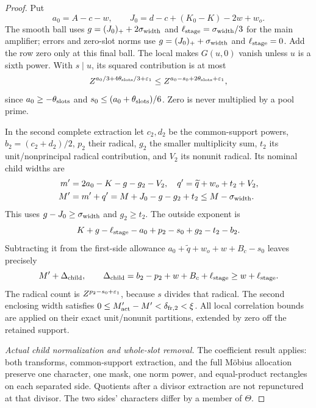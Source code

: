 \begin{proof}
Put
\[
 a_0=A-c-w,\qquad
 J_0=d-c+(K_0-K)-2w+w_o.
\]
The smooth ball uses $g=(J_0)_++2\sigma_{\rm width}$ and $\ell_{\rm stage}=\sigma_{\rm width}/3$ for the main amplifier; errors and zero-slot norms use $g=(J_0)_++\sigma_{\rm width}$ and $\ell_{\rm stage}=0$. Add the row zero only at this final ball. The local  makes $G(u,0)$ vanish unless $u$ is a sixth power. With $s\mid u$, its squared contribution is at most
\[
 Z^{a_0/3+4\theta_{\rm slots}/3+\varepsilon_1}
 \le Z^{a_0-s_0+2\theta_{\rm slots}+\varepsilon_1},
\]
since $a_0\ge-\theta_{\rm slots}$ and $s_0\le(a_0+\theta_{\rm slots})/6$. Zero is never multiplied by a pool prime.

In the second complete extraction let $c_2,d_2$ be the common-support powers, $b_2=(c_2+d_2)/2$, $p_2$ their radical, $g_2$ the smaller multiplicity sum, $t_2$ its unit/nonprincipal radical contribution, and $V_2$ its nonunit radical. Its nominal child widths are
\begin{align}
 m'&=2a_0-K-g-g_2-V_2,\quad
 q'=\widetilde q+w_o+t_2+V_2,\notag\\
 M'&=m'+q'=M+J_0-g-g_2+t_2\le M-\sigma_{\rm width}.\label{eq:childwidth}
\end{align}
This uses $g-J_0\ge\sigma_{\rm width}$ and $g_2\ge t_2$. The outside exponent is
\[
 K+g-\ell_{\rm stage}-a_0+p_2-s_0+g_2-t_2-b_2.
\]
Subtracting it from the first-side allowance $a_0+\widetilde q+w_o+w+B_c-s_0$ leaves precisely
\begin{equation}\label{eq:childallowance}
 M'+\Delta_{\rm child},\qquad
 \Delta_{\rm child}=b_2-p_2+w+B_c+\ell_{\rm stage}\ge w+\ell_{\rm stage}.
\end{equation}
The radical count is $Z^{p_2-s_0+\varepsilon_1}$, because $s$ divides that radical. The second enclosing width satisfies $0\le M'_{\rm act}-M'<\delta_{{\rm fr},2}<\xi$. All local correlation bounds are applied on their exact unit/nonunit partitions, extended by zero off the retained support.

\emph{Actual child normalization and whole-slot removal.}
The coefficient result  applies: both transforms, common-support extraction, and the full Möbius allocation preserve one character, one mask, one norm power, and equal-product rectangles on each separated side. Quotients after a divisor extraction are not repunctured at that divisor. The two sides' characters differ by a member of $\Theta$.


\end{proof}
